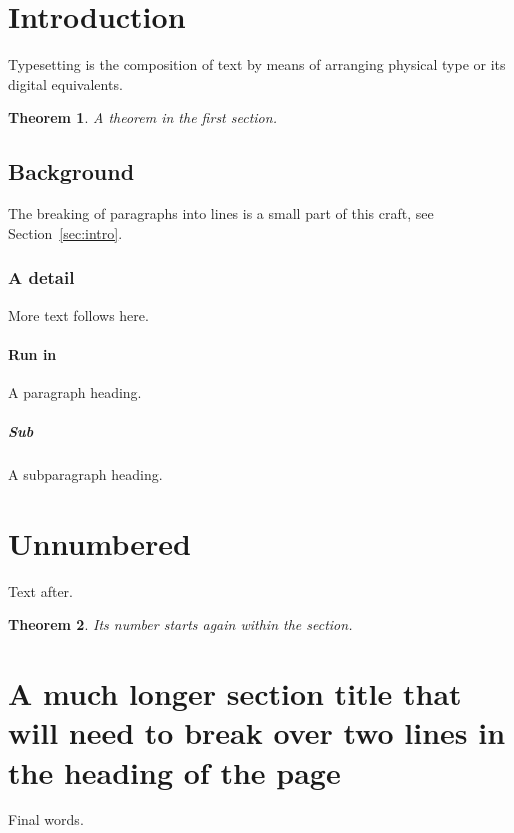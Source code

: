 \documentclass{scrartcl}
\newtheorem{theorem}{Theorem}[section]
\begin{document}
\section{Introduction}
Typesetting is the composition of text by means of arranging physical type or its digital equivalents.\label{sec:intro}
\begin{theorem}
A theorem in the first section.
\end{theorem}

\subsection{Background}
The breaking of paragraphs into lines is a small part of this craft, see Section~\ref{sec:intro}.

\subsubsection{A detail}
More text follows here.

\paragraph{Run in} A paragraph heading.

\subparagraph{Sub} A subparagraph heading.

\section*{Unnumbered}
Text after.
\begin{theorem}
Its number starts again within the section.
\end{theorem}
\section{A much longer section title that will need to break over two lines in the heading of the page}
Final words.
\end{document}
